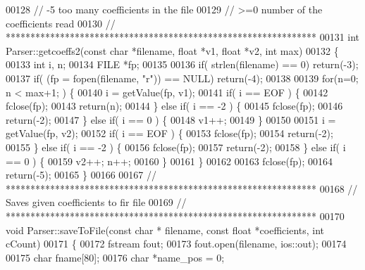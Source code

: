 \begin{DoxyCode}
00128 \textcolor{comment}{//  -5  too many coefficients in the file}
00129 \textcolor{comment}{//  >=0     number of the coefficients read}
00130 \textcolor{comment}{// ***************************************************************}
00131 \textcolor{keywordtype}{int} Parser::getcoeffs2(\textcolor{keyword}{const} \textcolor{keywordtype}{char} *filename, \textcolor{keywordtype}{float} *v1, \textcolor{keywordtype}{float} *v2, \textcolor{keywordtype}{int} max)
00132 \{
00133     \textcolor{keywordtype}{int} i, n;
00134     FILE *fp;
00135 
00136     \textcolor{keywordflow}{if}( strlen(filename) == 0) \textcolor{keywordflow}{return}(-3);
00137     \textcolor{keywordflow}{if}( (fp = fopen(filename, \textcolor{stringliteral}{"r"})) == NULL) \textcolor{keywordflow}{return}(-4);
00138 
00139     \textcolor{keywordflow}{for}(n=0; n < max+1; ) \{
00140         i = getValue(fp, v1);
00141         \textcolor{keywordflow}{if}( i == EOF ) \{
00142             fclose(fp);
00143             \textcolor{keywordflow}{return}(n);
00144         \} \textcolor{keywordflow}{else} \textcolor{keywordflow}{if}( i ==  -2 ) \{
00145             fclose(fp);
00146             \textcolor{keywordflow}{return}(-2);
00147         \} \textcolor{keywordflow}{else} \textcolor{keywordflow}{if}( i == 0 ) \{
00148             v1++;
00149         \}
00150 
00151         i = getValue(fp, v2);
00152         \textcolor{keywordflow}{if}( i == EOF ) \{
00153             fclose(fp);
00154             \textcolor{keywordflow}{return}(-2);
00155         \} \textcolor{keywordflow}{else} \textcolor{keywordflow}{if}( i ==  -2 ) \{
00156             fclose(fp);
00157             \textcolor{keywordflow}{return}(-2);
00158         \} \textcolor{keywordflow}{else} \textcolor{keywordflow}{if}( i == 0 ) \{
00159             v2++; n++;
00160         \}
00161     \}
00162 
00163     fclose(fp);
00164     \textcolor{keywordflow}{return}(-5);
00165 \}
00166 
00167 \textcolor{comment}{// ***************************************************************}
00168 \textcolor{comment}{// Saves given coefficients to fir file}
00169 \textcolor{comment}{// ***************************************************************}
00170 \textcolor{keywordtype}{void} Parser::saveToFile(\textcolor{keyword}{const} \textcolor{keywordtype}{char} * filename, \textcolor{keyword}{const} \textcolor{keywordtype}{float} *coefficients, \textcolor{keywordtype}{int} cCount)
00171 \{
00172     fstream fout;
00173     fout.open(filename, ios::out);
00174 
00175     \textcolor{keywordtype}{char} fname[80];
00176     \textcolor{keywordtype}{char} *name\_pos = 0;

\end{DoxyCode}
